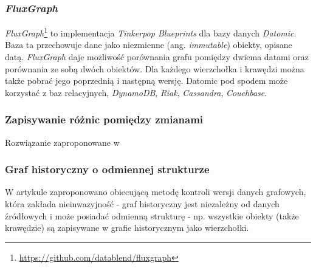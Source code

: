 \subsubsection{\emph{FluxGraph}}
\label{sec:fluxGraph}

\emph{FluxGraph}\footnote{\url{https://github.com/datablend/fluxgraph}} to implementacja \emph{Tinkerpop Blueprints} dla bazy danych \emph{Datomic}. Baza ta przechowuje dane jako niezmienne (ang. \emph{immutable}) obiekty, opisane datą. \emph{FluxGraph} daje możliwość porównania grafu pomiędzy dwiema datami oraz porównania ze sobą dwóch obiektów. Dla każdego wierzchołka i krawędzi można także pobrać jego poprzednią i następną wersję. Datomic pod spodem może korzystać z baz relacyjnych, \emph{DynamoDB}, \emph{Riak}, \emph{Cassandra}, \emph{Couchbase}.

\subsubsection{Zapisywanie różnic pomiędzy zmianami}
\label{sec:roznice}

Rozwiązanie zaproponowane w \cite{journals/corr/abs-1302-5549}

\subsubsection{Graf historyczny o odmiennej strukturze}
\label{sec:castelltort}

W artykule \cite{conf/icdim/CastelltortL13} zaproponowano obiecującą metodę kontroli wersji danych grafowych, która zakłada nieinwazyjność - graf historyczny jest niezależny od danych źródłowych i może posiadać odmienną strukturę - np. wszystkie obiekty (także krawędzie) są zapisywane w grafie historycznym jako wierzchołki.





